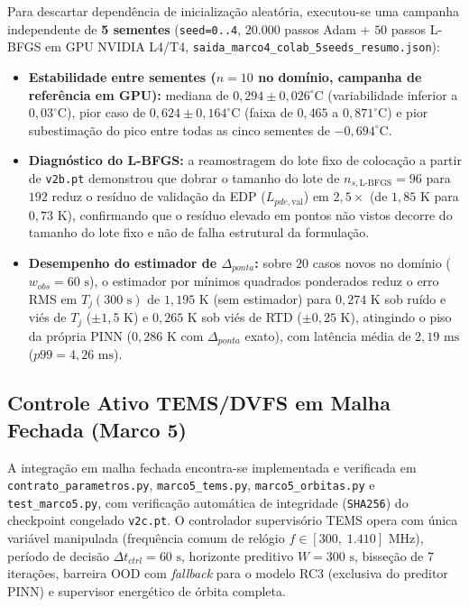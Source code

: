 Para descartar dependência de inicialização aleatória, executou-se uma campanha independente de \textbf{5 sementes} (\texttt{seed=0..4}, $20.000$ passos Adam + $50$ passos L-BFGS em GPU NVIDIA L4/T4, \texttt{saida\_marco4\_colab\_5seeds\_resumo.json}):
\begin{itemize}
    \item \textbf{Estabilidade entre sementes ($n=10$ no domínio, campanha de referência em GPU):} mediana de $0{,}294 \pm 0{,}026^\circ\text{C}$ (variabilidade inferior a $0{,}03^\circ\text{C}$), pior caso de $0{,}624 \pm 0{,}164^\circ\text{C}$ (faixa de $0{,}465$ a $0{,}871^\circ\text{C}$) e pior subestimação do pico entre todas as cinco sementes de $-0{,}694^\circ\text{C}$.
    \item \textbf{Diagnóstico do L-BFGS:} a reamostragem do lote fixo de colocação a partir de \texttt{v2b.pt} demonstrou que dobrar o tamanho do lote de $n_{s,\text{L-BFGS}} = 96$ para $192$ reduz o resíduo de validação da EDP ($L_{pde,\text{val}}$) em $2{,}5\times$ (de $1{,}85\text{ K}$ para $0{,}73\text{ K}$), confirmando que o resíduo elevado em pontos não vistos decorre do tamanho do lote fixo e não de falha estrutural da formulação.
    \item \textbf{Desempenho do estimador de $\Delta_{ponta}$:} sobre $20$ casos novos no domínio ($w_{obs} = 60\text{ s}$), o estimador por mínimos quadrados ponderados reduz o erro RMS em $T_j(300\text{ s})$ de $1{,}195\text{ K}$ (sem estimador) para $0{,}274\text{ K}$ sob ruído e viés de $T_j$ ($\pm 1{,}5\text{ K}$) e $0{,}265\text{ K}$ sob viés de RTD ($\pm 0{,}25\text{ K}$), atingindo o piso da própria PINN ($0{,}286\text{ K}$ com $\Delta_{ponta}$ exato), com latência média de $2{,}19\text{ ms}$ ($p99 = 4{,}26\text{ ms}$).
\end{itemize}

\subsection{Controle Ativo TEMS/DVFS em Malha Fechada (Marco 5)}
\label{sec:resultados_marco5}

A integração em malha fechada encontra-se implementada e verificada em \texttt{contrato\_parametros.py}, \texttt{marco5\_tems.py}, \texttt{marco5\_orbitas.py} e \texttt{test\_marco5.py}, com verificação automática de integridade (\texttt{SHA256}) do checkpoint congelado \texttt{v2c.pt}. O controlador supervisório TEMS opera com única variável manipulada (frequência comum de relógio $f \in [300,\; 1.410]\text{ MHz}$), período de decisão $\Delta t_{ctrl} = 60\text{ s}$, horizonte preditivo $W = 300\text{ s}$, bisseção de 7 iterações, barreira OOD com \textit{fallback} para o modelo RC3 (exclusiva do preditor PINN) e supervisor energético de órbita completa.

